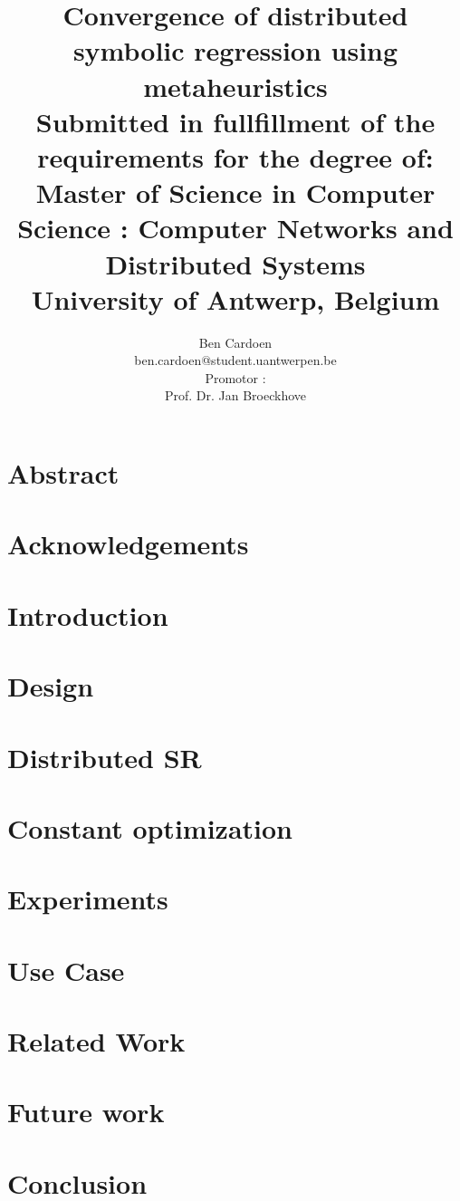 \documentclass[titlepage]{article}
\title{Convergence of distributed symbolic regression using metaheuristics\\
\small Submitted in fullfillment of the requirements for the degree of:\\ Master of Science in Computer Science : Computer Networks and Distributed Systems\\
University of Antwerp, Belgium
    }
\author{
    Ben Cardoen  \\
    ben.cardoen@student.uantwerpen.be\\
    Promotor : \\
    Prof. Dr. Jan Broeckhove
}
\begin{document}
    
    \maketitle
    \section{Abstract}
    
    \newpage
    
    \section{Acknowledgements}
    
    \newpage
    
    \tableofcontents
    
    \newpage
    \section{Introduction}
    
    \newpage
    \section{Design}\label{secdesign}
    
    \newpage
    \section{Distributed SR}\label{secdistributed}
    
    \newpage
    \section{Constant optimization}\label{secconstopt}
    
    \newpage
    \section{Experiments}\label{secexperiments}
    
    \newpage
    \section{Use Case}\label{secusecase}
    
    \newpage
    \section{Related Work}
    
    \newpage
	\section{Future work}
    
    \newpage
    \section{Conclusion}
    
    \newpage
	\listoffigures
	\newpage
    \listoftables
    \newpage
    
    
    
\end{document}
